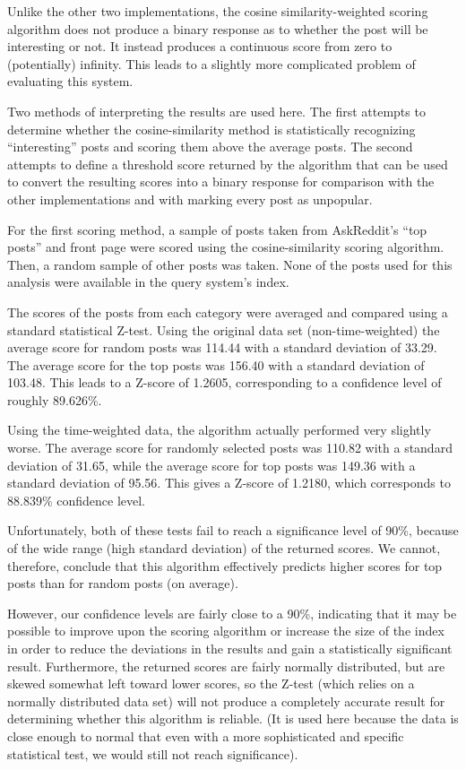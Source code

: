 \documentclass{acm_proc_article-sp}
\begin{document}
Unlike the other two implementations, the cosine similarity-weighted scoring algorithm does not produce a binary
response as to whether the post will be interesting or not.  It instead produces a continuous score from zero
to (potentially) infinity.  This leads to a slightly more complicated problem of evaluating this system.

Two methods of interpreting the results are used here.  The first attempts to determine whether the cosine-similarity method
is statistically recognizing ``interesting'' posts and scoring them above the average posts.  The second attempts to define
a threshold score returned by the algorithm that can be used to convert the resulting scores into a binary response for
comparison with the other implementations and with marking every post as unpopular.

For the first scoring method, a sample of posts taken from AskReddit's ``top posts'' and front page were scored using the
cosine-similarity scoring algorithm.  Then, a random sample of other posts was taken.  None of the posts used for this
analysis were available in the query system's index.

The scores of the posts from each category were averaged and compared using a standard statistical Z-test.  Using the
original data set (non-time-weighted) the average score for random posts was 114.44 with a standard deviation of 33.29.
The average score for the top posts was 156.40 with a standard deviation of 103.48.  This leads to a Z-score of
1.2605, corresponding to a confidence level of roughly 89.626\%.

Using the time-weighted data, the algorithm actually performed very slightly worse.  The average score for randomly
selected posts was 110.82 with a standard deviation of 31.65, while the average score for top posts was 149.36 with
a standard deviation of 95.56.  This gives a Z-score of 1.2180, which corresponds to 88.839\% confidence level.

Unfortunately, both of these tests fail to reach a significance level of 90\%, because of the wide range (high standard
deviation) of the returned scores.  We cannot, therefore, conclude that this algorithm effectively predicts higher scores
for top posts than for random posts (on average).

However, our confidence levels are fairly close to a 90\%, indicating that it may be possible to improve upon the
scoring algorithm or increase the size of the index in order to reduce the deviations in the results and gain a
statistically significant result.  Furthermore, the returned scores are fairly normally distributed, but are skewed
somewhat left toward lower scores, so the Z-test (which relies on a normally distributed data set) will not produce
a completely accurate result for determining whether this algorithm is reliable.  (It is used here because the data
is close enough to normal that even with a more sophisticated and specific statistical test, we would still not reach
significance).
\end{document}
